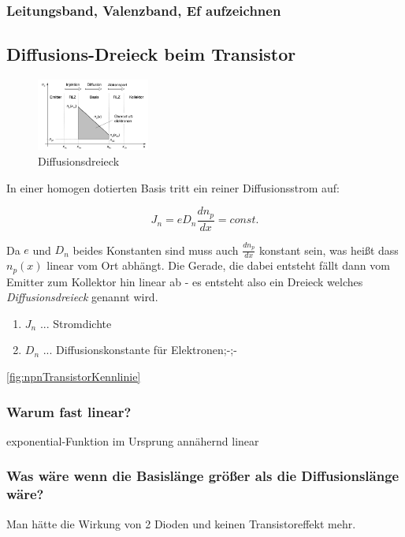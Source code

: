     \subsubsection{Leitungsband, Valenzband, Ef aufzeichnen}

\subsection{Diffusions-Dreieck beim Transistor }\label{k6:diffusionsdreieck}

    \begin{figure}[H]
        \centering
        \includegraphics[width=0.33\textwidth]{fig/transistor-diffusionsdreieck.jpg}
        \caption{Diffusionsdreieck }
        \label{fig:transistor-diffusionsdreieck}
    \end{figure}

In einer homogen dotierten Basis tritt ein reiner Diffusionsstrom auf:

\begin{equation}
    J_n = eD_n\frac{dn_p}{dx} = const.
\end{equation}

Da $e$ und $D_n$ beides Konstanten sind muss auch $\frac{dn_p}{dx}$ konstant sein, was heißt dass $n_p(x)$ linear vom Ort abhängt.
Die Gerade, die dabei entsteht fällt dann vom Emitter zum Kollektor hin linear ab - es entsteht also ein Dreieck welches \textit{Diffusionsdreieck} genannt wird. 

\begin{enumerate}
    \item $J_n$ ... Stromdichte
    \item $D_n$ ... Diffusionskonstante für Elektronen;-;-
\end{enumerate}

\autoref{fig:npnTransistorKennlinie}
    \subsubsection{Warum fast linear?} exponential-Funktion im Ursprung ann\"ahernd linear
    \subsubsection{Was w\"are wenn die Basisl\"ange gr\"o{\ss}er als die Diffusionsl\"ange w\"are?} Man h\"atte die Wirkung von 2 Dioden und keinen Transistoreffekt mehr.

